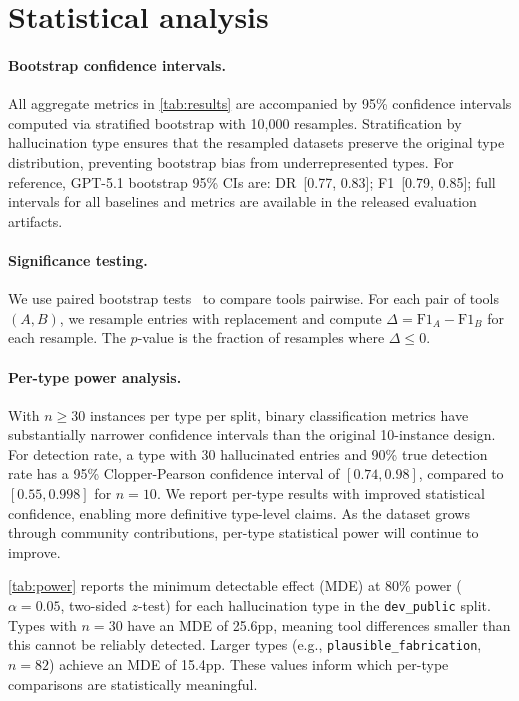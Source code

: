 \section{Statistical analysis}
\label{app:statistics}

\paragraph{Bootstrap confidence intervals.}
All aggregate metrics in \cref{tab:results} are accompanied by 95\% confidence intervals computed via stratified bootstrap with 10{,}000 resamples.
Stratification by hallucination type ensures that the resampled datasets preserve the original type distribution, preventing bootstrap bias from underrepresented types.
For reference, GPT-5.1 bootstrap 95\% CIs are: DR~[0.77, 0.83]; F1~[0.79, 0.85]; full intervals for all baselines and metrics are available in the released evaluation artifacts.

\paragraph{Significance testing.}
We use paired bootstrap tests~\citep{efron1994bootstrap} to compare tools pairwise.
For each pair of tools $(A, B)$, we resample entries with replacement and compute $\Delta = \text{F1}_A - \text{F1}_B$ for each resample.
The $p$-value is the fraction of resamples where $\Delta \leq 0$.

\paragraph{Per-type power analysis.}
With $n \geq 30$ instances per type per split, binary classification metrics have substantially narrower confidence intervals than the original 10-instance design.
For detection rate, a type with 30 hallucinated entries and 90\% true detection rate has a 95\% Clopper-Pearson confidence interval of $[0.74, 0.98]$, compared to $[0.55, 0.998]$ for $n=10$.
We report per-type results with improved statistical confidence, enabling more definitive type-level claims.
As the dataset grows through community contributions, per-type statistical power will continue to improve.

\cref{tab:power} reports the minimum detectable effect (MDE) at 80\% power ($\alpha=0.05$, two-sided $z$-test) for each hallucination type in the \texttt{dev\_public} split.
Types with $n=30$ have an MDE of 25.6pp, meaning tool differences smaller than this cannot be reliably detected.
Larger types (e.g., \texttt{plausible\_fabrication}, $n=82$) achieve an MDE of 15.4pp.
These values inform which per-type comparisons are statistically meaningful.

